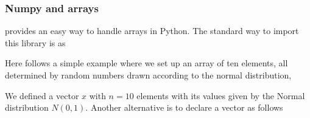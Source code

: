\documentclass[letterpaper,10pt,english]{sphinxmanual}
\begin{document}
\subsubsection{Numpy and arrays}
\label{\detokenize{chapter2:numpy-and-arrays}}
 provides an easy way to handle arrays in Python. The standard way to import this library is as

\begin{sphinxVerbatim}[commandchars=\\\{\}]
   
\end{sphinxVerbatim}

Here follows a simple example where we set up an array of ten elements, all determined by random numbers drawn according to the normal distribution,

\begin{sphinxVerbatim}[commandchars=\\\{\}]
  
  
\end{sphinxVerbatim}

\begin{sphinxVerbatim}
\end{sphinxVerbatim}

We defined a vector \(x\) with \(n=10\) elements with its values given by the Normal distribution \(N(0,1)\).
Another alternative is to declare a vector as follows

\begin{sphinxVerbatim}[commandchars=\\\{\}]
   
  \PYG{p}{[}  \PYG{p}{]}
\end{sphinxVerbatim}

\begin{sphinxVerbatim}[commandchars=\\\{\}]
[1 2 3]
\end{sphinxVerbatim}
\end{document}
